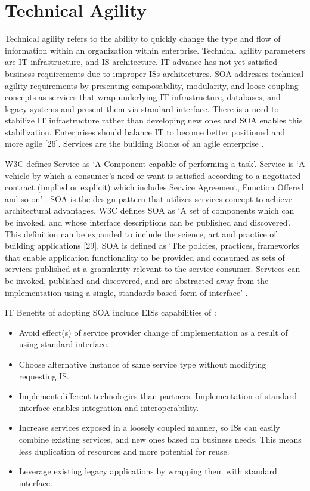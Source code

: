 \documentclass[12pt,a4paper,final,twoside,onecolumn,titlepage]{book}
\begin{document}
\section{Technical Agility}
Technical agility refers to the ability to quickly change the type and flow of information within an organization within enterprise. Technical agility parameters are IT infrastructure, and \gls{IS} architecture. IT advance has not yet satisfied business requirements due to improper \gls{IS}s architectures. \gls{SOA} addresses technical agility requirements by presenting composability, modularity, and loose coupling concepts as services that wrap underlying IT infrastructure, databases, and legacy systems and present them via standard interface. There is a need to stabilize IT infrastructure rather than developing new ones \cite{W28} and \gls{SOA} enables this stabilization. Enterprises should balance IT to become better positioned and more agile [26]. Services are the building Blocks of an agile enterprise \cite{W30}. 

\gls{W3C} defines Service as ‘A Component capable of performing a task’. Service is ‘A vehicle by which a consumer’s need or want is satisfied according to a negotiated contract (implied or explicit) which includes Service Agreement, Function Offered and so on’ \cite{BS28}. \gls{SOA} is the design pattern that utilizes services concept to achieve architectural advantages. \gls{W3C} defines \gls{SOA} as ‘A set of components which can be invoked, and whose interface descriptions can be published and discovered’. This definition can be expanded to include the science, art and practice of building applications [29]. \gls{SOA} is defined as ‘The policies, practices, frameworks that enable application functionality to be provided and consumed as sets of services published at a granularity relevant to the service consumer. Services can be invoked, published and discovered, and are abstracted away from the implementation using a single, standards based form of interface’ \cite{BS28}. 

IT Benefits of adopting \gls{SOA} include \gls{EIS}s capabilities of \cite{BS30,BS31}: 
\begin{itemize}
\item Avoid effect(s) of service provider change of implementation as a result of using standard interface.
\item Choose alternative instance of same service type without modifying requesting \gls{IS}.
\item Implement different technologies than partners. Implementation of standard interface enables integration and interoperability.
\item Increase services exposed in a loosely coupled manner, so \gls{IS}s can easily combine existing services, and new ones based on business needs. This means less duplication of resources and more potential for reuse.
\item Leverage existing legacy applications by wrapping them with standard interface.
\end{itemize}
\end{document}
